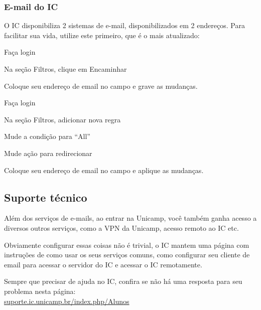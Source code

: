 \subsubsection{E-mail do IC}

O IC disponibiliza 2 sistemas de e-mail, disponibilizados em 2 endereços. Para
facilitar sua vida, utilize este primeiro, que é o mais atualizado:

\begin{compactenumerate}
\item {}
\item Faça login
\item Na seção Filtros, clique em Encaminhar
\item Coloque seu endereço de email no campo e grave as mudanças.
\end{compactenumerate}

\begin{compactenumerate}
\item {}
\item Faça login
\item Na seção Filtros, adicionar nova regra
\item Mude a condição para ``All''
\item Mude ação para redirecionar
\item Coloque seu endereço de email no campo e aplique as mudanças.
\end{compactenumerate}

\subsection{Suporte técnico}

Além dos serviços de e-mails, ao entrar na Unicamp, você também ganha acesso a
diversos outros serviços, como a VPN da Unicamp, acesso remoto ao IC etc.

Obviamente configurar essas coisas não é trivial, o IC mantem uma página com
instruções de como usar os seus serviços comuns, como configurar seu cliente de
email para acessar o servidor do IC e acessar o IC remotamente.

Sempre que precisar de ajuda no IC, confira se não há uma resposta para seu
problema nesta página:\\
\url{suporte.ic.unicamp.br/index.php/Alunos}


